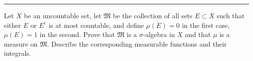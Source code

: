 \documentclass[letterpaper, 12pt]{article}
\begin{document}
\noindent\rule{7in}{2.8pt}
\begin{problem}{1.6}
Let \(X\) be an uncountable set, let \(\mathfrak{M}\) be the collection of all sets \(E\subset X\) such that either \(E\) or \(E^c\) is at most countable, and define \(\mu(E)=0\) in the first case, \(\mu(E)=1\) in the second. Prove that \(\mathfrak{M}\) is a \(\sigma\)-algebra in \(X\) and that \(\mu\) is a measure on \(\mathfrak{M}\). Describe the corresponding measurable functions and their integrals.
\end{problem}
\begin{solution}

\end{solution}
\end{document}

